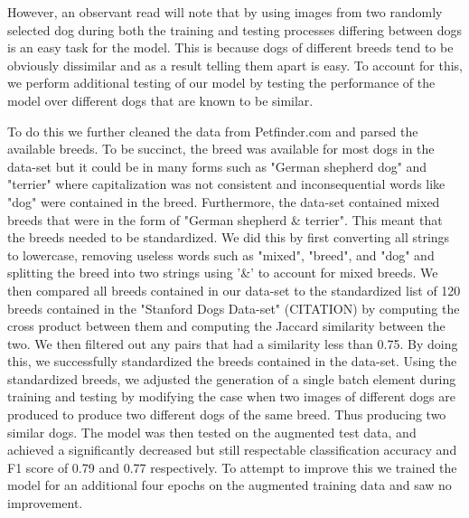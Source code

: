 \documentclass{article}
\begin{document}
However, an observant read will note that by using images from two randomly selected dog during both the training and testing processes differing between dogs is an easy task for the model.  This is because dogs of different breeds tend to be obviously dissimilar and as a result telling them apart is easy.  To account for this, we perform additional testing of our model by testing the performance of the model over different dogs that are known to be similar.

To do this we further cleaned the data from Petfinder.com and parsed the available breeds.  To be succinct, the breed was available for most dogs in the data-set but it could be in many forms such as "German shepherd dog" and "terrier" where capitalization was not consistent and inconsequential words like "dog" were contained in the breed.  Furthermore, the data-set contained mixed breeds that were in the form of "German shepherd & terrier".  This meant that the breeds needed to be standardized.  We did this by first converting all strings to lowercase, removing useless words such as "mixed", "breed", and "dog" and splitting the breed into two strings using '&' to account for mixed breeds.  We then compared all breeds contained in our data-set to the standardized list of 120 breeds contained in the "Stanford Dogs Data-set" (CITATION) by computing the cross product between them and computing the Jaccard similarity between the two.  We then filtered out any pairs that had a similarity less than 0.75.  By doing this, we successfully standardized the breeds contained in the data-set.  Using the standardized breeds, we adjusted the generation of a single batch element during training and testing by modifying the case when two images of different dogs are produced to produce two different dogs of the same breed.  Thus producing two similar dogs.  The model was then tested on the augmented test data, and achieved a significantly decreased but still respectable classification accuracy and F1 score of 0.79 and 0.77 respectively.   To attempt to improve this we trained the model for an additional four epochs on the augmented training data and saw no improvement.  
    
\end{document}
